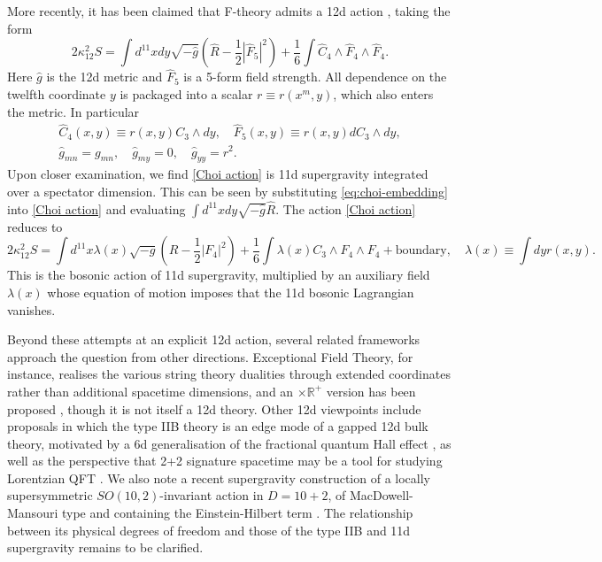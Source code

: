 More recently, it has been claimed that F-theory \cite{Vafa:1996xn} admits a 12d action \cite{Choi:2014vya,Choi:2015gia}, taking the form
\begin{equation}
2\kappa_{12}^2S = \int d^{11}x dy \sqrt{-\widehat{g}}
\left(
\widehat{R}-\frac{1}{2}|\widehat{F}_5|^2
\right)
+\frac{1}{6}
\int \widehat{C}_4\wedge \widehat{F}_4 \wedge \widehat{F}_4.
\label{Choi action}
\end{equation}
Here $\widehat{g}$ is the 12d metric and $\widehat{F}_5$ is a 5-form field strength.
All dependence on the twelfth coordinate $y$ is packaged into a scalar $r\equiv r(x^m,y)$, which also enters the metric.
In particular
\begin{equation}
\begin{gathered}
\widehat{C}_4(x,y) \equiv r(x,y) C_3\wedge dy,\quad
\widehat{F}_5(x,y) \equiv r(x,y) d C_3\wedge dy,\\
\widehat{g}_{mn} = g_{mn},\quad
\widehat{g}_{my} = 0,\quad
\widehat{g}_{yy} = r^2.
\label{eq:choi-embedding}
\end{gathered}
\end{equation}
Upon closer examination, we find \eqref{Choi action} is 11d supergravity integrated over a spectator dimension.
This can be seen by substituting \eqref{eq:choi-embedding} into \eqref{Choi action} and evaluating $\int d^{11}x dy \sqrt{-\widehat{g}} \widehat{R}$.
The action \eqref{Choi action} reduces to
\begin{equation}
2\kappa_{12}^2 S =
\int d^{11}x \lambda(x)\sqrt{-g}
\left(R-\frac{1}{2}|F_4|^2\right)
+\frac{1}{6}\int \lambda(x) C_3\wedge F_4\wedge F_4
+\text{boundary},\quad
\lambda(x)\equiv \int dy r(x,y).
\end{equation}
This is the bosonic action of 11d supergravity, multiplied by an auxiliary field $\lambda(x)$ whose equation of motion imposes that the 11d bosonic Lagrangian vanishes.

Beyond these attempts at an explicit 12d action, several related frameworks approach the question from other directions.
Exceptional Field Theory, for instance, realises the various string theory dualities through extended coordinates rather than additional spacetime dimensions, and an \SLR{}$\times \mathbb{R}^+$ version has been proposed \cite{Berman:2015rcc,Rudolph:2017vzy}, though it is not itself a 12d theory.
Other 12d viewpoints include proposals in which the type IIB theory is an edge mode of a gapped 12d bulk theory, motivated by a 6d generalisation of the fractional quantum Hall effect \cite{Heckman:2017uxe}, as well as the perspective that 2+2 signature spacetime may be a tool for studying Lorentzian QFT \cite{Heckman:2018mxl,Heckman:2022peq}. 
We also note a recent supergravity construction of a locally supersymmetric $SO(10, 2)$-invariant action in $D=10+2$, of MacDowell-Mansouri type and containing the Einstein-Hilbert term \cite{Castellani:2017vbi}.
The relationship between its physical degrees of freedom and those of the type IIB and 11d supergravity remains to be clarified.

